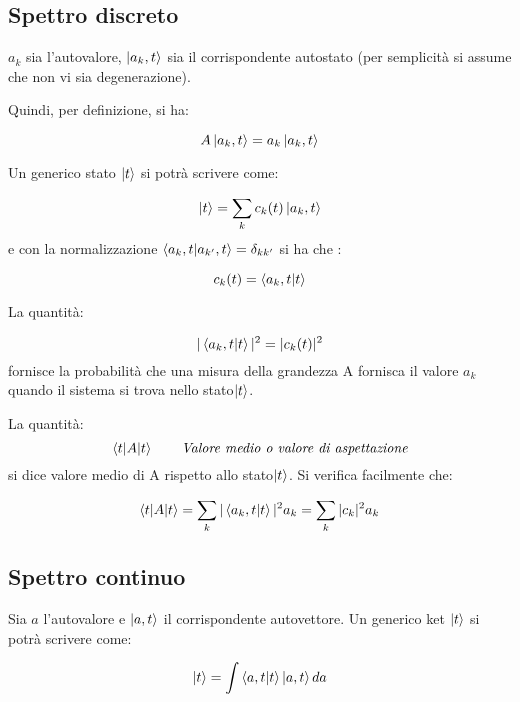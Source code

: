 \subsection{Spettro discreto}
$a_{k}$ sia l'autovalore, $\ket{a_{k},t}$ sia il corrispondente autostato (per semplicità si assume che non vi sia degenerazione).

Quindi, per definizione, si ha:

\begin{equation}
A\ket{a_{k},t}=a_{k}\ket{a_{k},t}
\end{equation}

Un generico stato $\ket{t}$ si potrà scrivere come:

\begin{equation}
\ket{t}=\sum_{k}c_{k}(t)\ket{a_{k},t}
\end{equation}
e con la normalizzazione $\braket{a_{k},t|a_{k'},t}=\delta_{kk'}$ si ha che :

\begin{equation}
c_{k}(t)=\braket{a_{k},t|t}
\end{equation}

La quantità:

\begin{equation}
|\braket{a_{k},t|t}|^2=|c_{k}(t)|^2
\end{equation}
fornisce la probabilità che una misura della grandezza A fornisca il valore $a_{k}$ quando il sistema si trova nello stato$ \ket{t}$.

La quantità:
\begin{equation}
\braket{t|A|t}     \qquad \textit{Valore medio o valore di aspettazione}
\end{equation}
si dice valore medio di A rispetto allo stato$\ket{t}$. Si verifica facilmente che:

\begin{equation}
\braket{t|A|t}=\sum_{k}|\braket{a_{k},t|t}|^2a_{k}= \sum_{k}|c_{k}|^2a_{k}
\end{equation}

\subsection{Spettro continuo}
Sia $a$ l'autovalore e $\ket{a,t}$ il corrispondente autovettore. Un generico ket $\ket{t}$ si potrà scrivere come:

\begin{equation}
\ket{t}=\int\braket{a,t|t}\ket{a,t}da
\end{equation}


